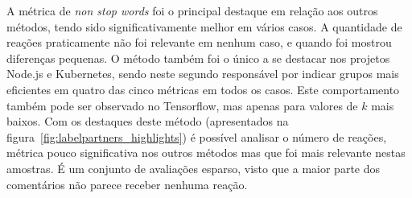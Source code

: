 \documentclass[12pt,openany,oneside,a4paper,english,brazil]{abntbibufjf}
\begin{document}
A métrica de \textit{non stop words} foi o principal destaque em relação aos outros métodos, tendo sido significativamente melhor em vários casos. A quantidade de reações praticamente não foi relevante em nenhum caso, e quando foi mostrou diferenças pequenas. O método também foi o único a se destacar nos projetos Node.js e Kubernetes, sendo neste segundo responsável por indicar grupos mais eficientes em quatro das cinco métricas em todos os casos. Este comportamento também pode ser observado no Tensorflow, mas apenas para valores de $k$ mais baixos. Com os destaques deste método (apresentados na figura~\ref{fig:labelpartners_highlights}) é possível analisar o número de reações, métrica pouco significativa nos outros métodos mas que foi mais relevante nestas amostras. É um conjunto de avaliações esparso, visto que a maior parte dos comentários não parece receber nenhuma reação.
\end{document}
